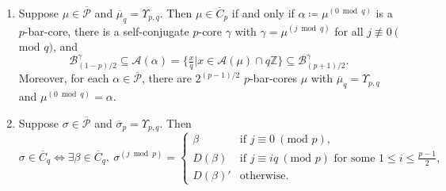 \documentclass[ALCO, Unicode,published]{cedram}
\newcommand*\nicefrac[2]{#1/#2}
\begin{document}
\begin{prop}\label{prop9}
\begin{enumerate}
\item Suppose $\mu\in\overline{\mathcal{P}}$ and $\overline{\mu}_q=\Upsilon_{p,q}$. Then $\mu\in\overline{C}_p$ if and only if $\alpha\coloneqq\mu^{(0\bmod q)}$ is a $p$-bar-core, there is a self-conjugate $p$-core $\gamma$ with $\gamma=\mu^{(j\bmod q)}$ for all $j\not\equiv0\:($mod $q)$, and 
$$\mathcal{B}^\gamma_{\nicefrac{(1-p)}{2}}\subseteq\mathcal{A}(\alpha)=\{\tfrac{x}{q}|x\in\mathcal{A}(\mu)\cap q\mathbb{Z}\}\subseteq\mathcal{B}^\gamma_{\nicefrac{(p+1)}{2}}.$$ 
Moreover, for each $\alpha\in\overline{\mathcal{P}}$, there are $2^{\nicefrac{(p-1)}{2}}$ $p$-bar-cores $\mu$ with $\overline{\mu}_q=\Upsilon_{p,q}$ and $\mu^{(0\bmod q)}=\alpha$. 
\item Suppose $\sigma\in\overline{\mathcal{P}}$ and $\overline{\sigma}_p=\Upsilon_{p,q}$. Then 
$$\sigma\in\overline{C}_q\Leftrightarrow\exists\beta\in\overline{C}_q,\:\sigma^{(j\bmod p)}=\begin{cases}\beta&\text{if }j\equiv0\:(\text{mod }p),\\
D(\beta)&\text{if }j\equiv iq\:(\text{mod }p)\text{ for some }1\leq i\leq\tfrac{p-1}{2},\\
D(\beta)'&\text{otherwise.}\end{cases}$$ 
\end{enumerate}
\end{prop}
\end{document}
